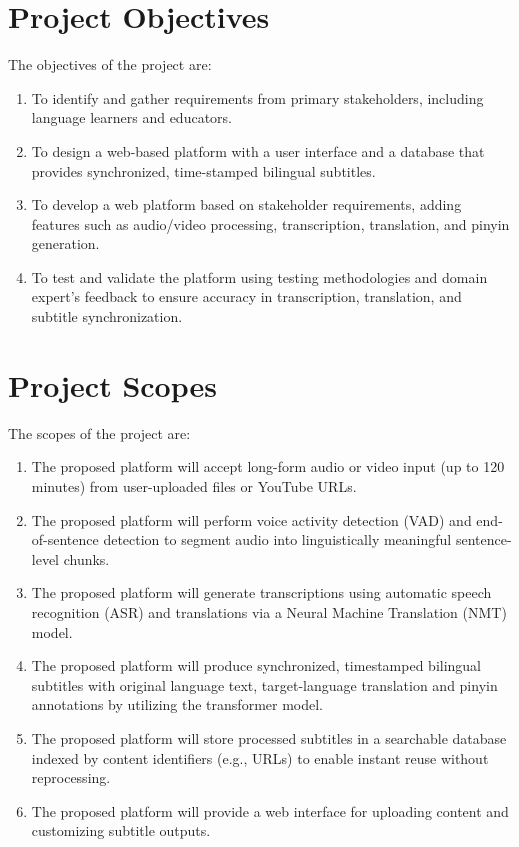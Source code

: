 \documentclass[oneside]{utmthesis}
\begin{document}
\section{Project Objectives}\label{sec:obj}
The objectives of the project are:
\begin{enumerate}[label= (\alph*)]
    \item To identify and gather requirements from primary stakeholders, including language learners and educators.
    \item To design a web-based platform with a user interface and a database that provides synchronized, time-stamped bilingual subtitles.
    \item To develop a web platform based on stakeholder requirements, adding features such as audio/video processing, transcription, translation, and pinyin generation.
    \item To test and validate the platform using testing methodologies and domain expert's feedback to ensure accuracy in transcription, translation, and subtitle synchronization.
\end{enumerate}
\section{Project Scopes}
The scopes of the project are:
\begin{enumerate}[label= (\alph*)]
    \item The proposed platform will accept long-form audio or video input (up to 120 minutes) from user-uploaded files or YouTube URLs.
    \item The proposed platform will perform voice activity detection (VAD) and end-of-sentence detection to segment audio into linguistically meaningful sentence-level chunks.
    \item The proposed platform will generate transcriptions using automatic speech recognition (ASR) and translations via a Neural Machine Translation (NMT) model.
    \item The proposed platform will produce synchronized, timestamped bilingual subtitles with original language text, target-language translation and pinyin annotations by utilizing the transformer model.
    \item The proposed platform will store processed subtitles in a searchable database indexed by content identifiers (e.g., URLs) to enable instant reuse without reprocessing.
    \item The proposed platform will provide a web interface for uploading content and customizing subtitle outputs.
\end{enumerate}
\end{document}
